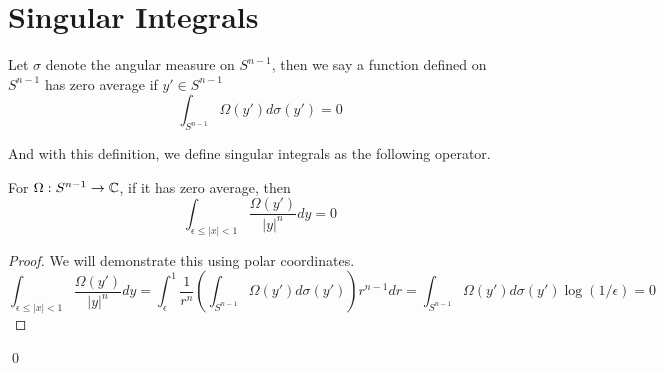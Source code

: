 \chapter{Singular Integrals}
\begin{definition}
    Let $\sigma$ denote the angular measure on $S^{n-1}$, then we say a function defined on $S^{n-1}$ has zero average if $y'\in S^{n-1}$
    \begin{equation*}
        \int_{S^{n-1}}\Omega(y')d\sigma(y')=0
    \end{equation*}
\end{definition}
And with this definition, we define singular integrals as the following operator.
\begin{proposition}
    For $\Omega:S^{n-1}\to\mathbb{C}$, if it has zero average, then
    \begin{equation*}
        \int_{\epsilon\leq|x|<1}\frac{\Omega(y')}{|y|^n}dy=0
    \end{equation*}
\end{proposition}
\begin{proof}
    We will demonstrate this using polar coordinates.
    \begin{equation*}
        \int_{\epsilon\leq|x|<1}\frac{\Omega(y')}{|y|^n}dy=\int_\epsilon^1 \frac{1}{r^n}\left(\int_{S^{n-1}}\Omega(y') d\sigma(y')\right)r^{n-1}dr=\int_{S^{n-1}}\Omega(y')d\sigma(y')\log(1/\epsilon)=0
    \end{equation*}
\end{proof}
\qed


